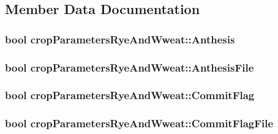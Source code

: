 \subsection{Member Data Documentation}
\hypertarget{classcrop_parameters_rye_and_wweat_a2499e4336e03b175a16225abb190ca1c}{
\subsubsection[{Anthesis}]{\setlength{\rightskip}{0pt plus 5cm}bool {\bf cropParametersRyeAndWweat::Anthesis}}}
\label{classcrop_parameters_rye_and_wweat_a2499e4336e03b175a16225abb190ca1c}
\hypertarget{classcrop_parameters_rye_and_wweat_a2431fe6b8fb0bab85584acbc8c7e6754}{
\subsubsection[{AnthesisFile}]{\setlength{\rightskip}{0pt plus 5cm}bool {\bf cropParametersRyeAndWweat::AnthesisFile}}}
\label{classcrop_parameters_rye_and_wweat_a2431fe6b8fb0bab85584acbc8c7e6754}
\hypertarget{classcrop_parameters_rye_and_wweat_a0063fb18264bd255d4899581ab4d08c0}{
\subsubsection[{CommitFlag}]{\setlength{\rightskip}{0pt plus 5cm}bool {\bf cropParametersRyeAndWweat::CommitFlag}}}
\label{classcrop_parameters_rye_and_wweat_a0063fb18264bd255d4899581ab4d08c0}
\hypertarget{classcrop_parameters_rye_and_wweat_a4c9e5e7344a650bd8c94593fc3ddcd78}{
\subsubsection[{CommitFlagFile}]{\setlength{\rightskip}{0pt plus 5cm}bool {\bf cropParametersRyeAndWweat::CommitFlagFile}}}
\label{classcrop_parameters_rye_and_wweat_a4c9e5e7344a650bd8c94593fc3ddcd78}
